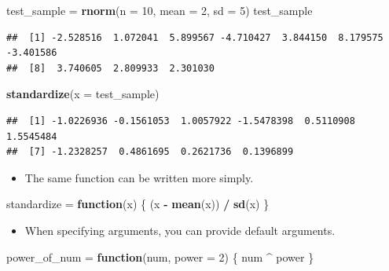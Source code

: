 \documentclass[]{book}
\newenvironment{Shaded}{\begin{snugshade}}{\end{snugshade}}
\newcommand{\KeywordTok}[1]{\textcolor[rgb]{0.13,0.29,0.53}{\textbf{#1}}}
\newcommand{\DataTypeTok}[1]{\textcolor[rgb]{0.13,0.29,0.53}{#1}}
\newcommand{\DecValTok}[1]{\textcolor[rgb]{0.00,0.00,0.81}{#1}}
\newcommand{\StringTok}[1]{\textcolor[rgb]{0.31,0.60,0.02}{#1}}
\newcommand{\ControlFlowTok}[1]{\textcolor[rgb]{0.13,0.29,0.53}{\textbf{#1}}}
\newcommand{\OperatorTok}[1]{\textcolor[rgb]{0.81,0.36,0.00}{\textbf{#1}}}
\newcommand{\NormalTok}[1]{#1}
\providecommand{\tightlist}{%
  \setlength{\itemsep}{0pt}\setlength{\parskip}{0pt}}
\begin{document}
\begin{Shaded}
\begin{Highlighting}[]
\NormalTok{test_sample =}\StringTok{ }\KeywordTok{rnorm}\NormalTok{(}\DataTypeTok{n =} \DecValTok{10}\NormalTok{, }\DataTypeTok{mean =} \DecValTok{2}\NormalTok{, }\DataTypeTok{sd =} \DecValTok{5}\NormalTok{)}
\NormalTok{test_sample}
\end{Highlighting}
\end{Shaded}

\begin{verbatim}
##  [1] -2.528516  1.072041  5.899567 -4.710427  3.844150  8.179575 -3.401586
##  [8]  3.740605  2.809933  2.301030
\end{verbatim}

\begin{Shaded}
\begin{Highlighting}[]
\KeywordTok{standardize}\NormalTok{(}\DataTypeTok{x =}\NormalTok{ test_sample)}
\end{Highlighting}
\end{Shaded}

\begin{verbatim}
##  [1] -1.0226936 -0.1561053  1.0057922 -1.5478398  0.5110908  1.5545484
##  [7] -1.2328257  0.4861695  0.2621736  0.1396899
\end{verbatim}

\begin{itemize}
\tightlist
\item
  The same function can be written more simply.
\end{itemize}

\begin{Shaded}
\begin{Highlighting}[]
\NormalTok{standardize =}\StringTok{ }\ControlFlowTok{function}\NormalTok{(x) \{}
\NormalTok{  (x }\OperatorTok{-}\StringTok{ }\KeywordTok{mean}\NormalTok{(x)) }\OperatorTok{/}\StringTok{ }\KeywordTok{sd}\NormalTok{(x)}
\NormalTok{\}}
\end{Highlighting}
\end{Shaded}

\begin{itemize}
\tightlist
\item
  When specifying arguments, you can provide default arguments.
\end{itemize}

\begin{Shaded}
\begin{Highlighting}[]
\NormalTok{power_of_num =}\StringTok{ }\ControlFlowTok{function}\NormalTok{(num, }\DataTypeTok{power =} \DecValTok{2}\NormalTok{) \{}
\NormalTok{  num }\OperatorTok{^}\StringTok{ }\NormalTok{power}
\NormalTok{\}}
\end{Highlighting}
\end{Shaded}
\end{document}
